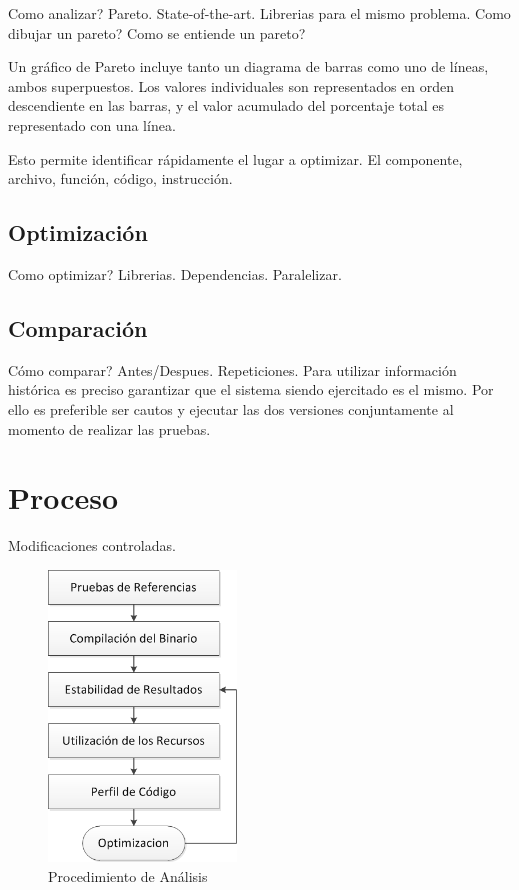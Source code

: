 \documentclass[a4paper]{report}
\begin{document}
Como analizar? Pareto. State-of-the-art. Librerias para el mismo problema.
Como dibujar un pareto? Como se entiende un pareto?

Un gr\'afico de Pareto incluye tanto un diagrama de barras como uno de l\'ineas, ambos superpuestos.
Los valores individuales son representados en orden descendiente en las barras, y el valor acumulado del porcentaje total es representado con una l\'inea.

Esto permite identificar r\'apidamente el lugar a optimizar. El componente, archivo, funci\'on, c\'odigo, instrucci\'on.

\subsection{Optimizaci\'on}

Como optimizar? Librerias. Dependencias. Paralelizar.

\subsection{Comparaci\'on}

C\'omo comparar? Antes/Despues. Repeticiones. Para utilizar informaci\'on
hist\'orica es preciso garantizar que el sistema siendo ejercitado es el mismo. Por ello es preferible ser cautos y ejecutar las dos versiones conjuntamente
al momento de realizar las pruebas. 

\section{Proceso}

Modificaciones controladas.

\begin{figure}[H]
\label{fig:procedure}
\begin{center}
\includegraphics[width=5cm]{procedure.png}
\caption{Procedimiento de An\'alisis}
\end{center}
\end{figure}
\end{document}
